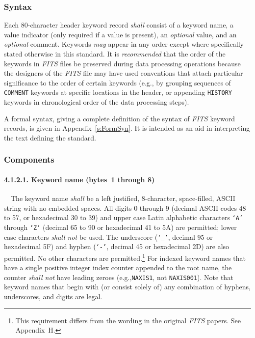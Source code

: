 \documentclass[onecolumn]{aa}
\begin{document}
   \subsubsection{Syntax}
  \label{s:keysyntax}
   Each 80-character header keyword record
   {\em shall} consist of a keyword name, a value indicator 
   (only required if a value
   is present), an {\em optional} value, and an {\em optional} comment.  
   Keywords {\em may} appear in any order except
   where specifically stated otherwise in this standard.
   It is {\em recommended} that the order of the keywords in 
   {\em FITS\/} files be preserved during data processing operations 
   because the designers of the {\em FITS\/} file may have used conventions 
   that attach particular significance to the order of certain keywords
   (e.g., by grouping sequences of {\tt COMMENT} keywords
   at specific locations in the header, or appending {\tt HISTORY} 
   keywords in chronological order of the data processing steps).

A formal syntax, giving a complete definition of the syntax of
{\em FITS\/} keyword records, is given in Appendix~\ref{s:FormSyn}.  
It is intended as an aid in interpreting the text defining the standard.
  
   \subsubsection{Components}
  
   \paragraph{4.1.2.1. Keyword name (bytes~1 through 8)}
       \label{s:keyw}
\ \newline \ \newline The keyword name {\em shall} be a left justified, 8-character, 
space-filled, ASCII string with no embedded spaces.  All 
digits 0 through 9 (decimal ASCII codes 48 to 57, or hexadecimal 30 to 39) and 
upper case
Latin alphabetic characters
{\tt `A'} through {\tt `Z'} (decimal 65 to 90 or hexadecimal 41 to 5A) are 
permitted; lower case characters {\em shall not} be used.  The 
underscore
({\tt `\_'}, decimal 95 or hexadecimal 5F) and 
hyphen
({\tt `-'}, decimal 45 or hexadecimal 2D) are also permitted.  No other characters
are permitted.\footnote{This requirement differs 
   from the wording in the original {\em FITS\/} papers.  
See Appendix~H.}  For indexed
keyword names that have a single 
positive integer index counter appended to the root name, the counter 
{\em shall not} have leading 
zeroes (e.g.,{\tt NAXIS1}, not {\tt NAXIS001}).
Note that keyword names that begin with (or consist solely of) any combination of hyphens, 
underscores, and digits are legal.
\end{document}
